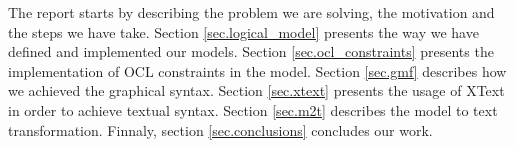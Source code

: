\noindent The report starts by describing the problem we are solving, the
motivation and the steps we have take. Section \ref{sec.logical_model}
presents the way we have defined and implemented our models. Section
\ref{sec.ocl_constraints} presents the implementation of OCL constraints in the
model. Section \ref{sec.gmf} describes how we achieved the graphical syntax.
Section \ref{sec.xtext} presents the usage of XText in order to achieve textual
syntax. Section \ref{sec.m2t} describes the model to text transformation.
Finnaly, section \ref{sec.conclusions} concludes our work.
